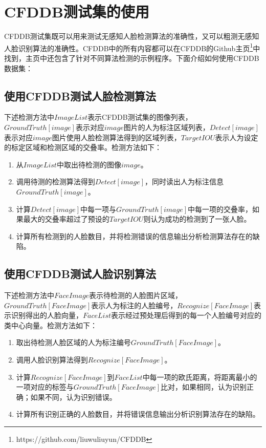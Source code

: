 \section{CFDDB测试集的使用}

CFDDB测试集既可以用来测试无感知人脸检测算法的准确性，又可以粗测无感知人脸识别算法的准确性。CFDDB中的所有内容都可以在CFDDB的Github主页\footnote{https://github.com/liuwuliuyun/CFDDB}中找到，主页中还包含了针对不同算法检测的示例程序。下面介绍如何使用CFDDB数据集：

\subsection{使用CFDDB测试人脸检测算法}

下述检测方法中$ImageList$表示CFDDB测试集的图像列表，$GroundTruth[image]$表示对应$image$图片的人为标注区域列表，$Detect[image]$表示对应$image$图片使用人脸检测算法得到的区域列表，$TargetIOU$表示人为设定的标定区域和检测区域的交叠率。检测方法如下：

\begin{enumerate}
	\item 从$ImageList$中取出待检测的图像$image$。
	\item 调用待测的检测算法得到$Detect[image]$，同时读出人为标注信息$GroundTruth[image]$。
	\item 计算$Detect[image]$中每一项与$GroundTruth[image]$中每一项的交叠率，如果最大的交叠率超过了预设的$TargetIOU$则认为成功的检测到了一张人脸。
	\item 计算所有检测到的人脸数目，并将检测错误的信息输出分析检测算法存在的缺陷。
\end{enumerate}

\subsection{使用CFDDB测试人脸识别算法}

下述检测方法中$FaceImage$表示待检测的人脸图片区域，$GroundTruth[FaceImage]$表示人为标注的人脸编号，$Recognize[FaceImage]$表示识别得出的人脸向量，$FaceList$表示经过预处理后得到的每一个人脸编号对应的类中心向量。检测方法如下：

\begin{enumerate}
	\item 取出待检测人脸区域的人为标注编号$GroundTruth[FaceImage]$。
	\item 调用人脸识别算法得到$Recognize[FaceImage]$。
	\item 计算$Recognize[FaceImage]$到$FaceList$中每一项的欧氏距离，将距离最小的一项对应的标签与$GroundTruth[FaceImage]$比对，如果相同，认为识别正确；如果不同，认为识别错误。
	\item 计算所有识别正确的人脸数目，并将错误信息输出分析识别算法存在的缺陷。
\end{enumerate}


